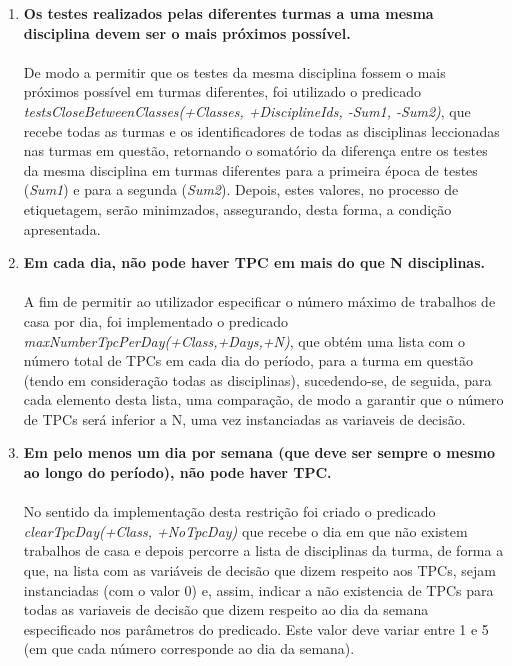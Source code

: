 \documentclass{llncs}
\begin{document}
\begin{enumerate}
	\item \textbf{Os testes realizados pelas diferentes turmas a uma mesma disciplina devem ser o mais próximos possível.} \\\\
		De modo a permitir que os testes da mesma disciplina fossem o mais próximos possível em turmas diferentes, foi utilizado o predicado  \textit{testsCloseBetweenClasses(+Classes, +DisciplineIds, -Sum1, -Sum2)}, 
		que recebe todas as turmas e os identificadores de todas as disciplinas leccionadas nas turmas em questão, retornando o somatório da diferença entre os testes da mesma disciplina em turmas diferentes para a 
		primeira época de testes (\textit{Sum1}) e para a segunda 
		(\textit{Sum2}). Depois, estes valores, no processo de etiquetagem, serão minimzados, assegurando, desta forma, a condição apresentada.
		\\

	\item \textbf{Em cada dia, não pode haver TPC em mais do que N disciplinas.} \\\\
		A fim de permitir ao utilizador especificar o número máximo de trabalhos de casa por dia, foi implementado o predicado \textit{maxNumberTpcPerDay(+Class,+Days,+N)}, que obtém uma lista com o número total de TPCs em cada dia do período, para a turma em questão (tendo em consideração todas as disciplinas), sucedendo-se, de seguida, para cada elemento desta lista, uma comparação, 
		de modo a garantir que o número de TPCs será inferior a N, uma vez instanciadas as variaveis de decisão.
		\\

	\item \textbf{Em pelo menos um dia por semana (que deve ser sempre o mesmo ao longo do período), não pode haver TPC.} \\\\
		No sentido da implementação desta restrição foi criado o predicado \textit{clearTpcDay(+Class, +NoTpcDay)} que recebe o dia em que não existem trabalhos de casa e depois percorre a lista de disciplinas da turma, de forma a que, na lista com as variáveis de decisão que dizem respeito aos TPCs, sejam instanciadas (com o valor 0) e, assim, indicar a não existencia de TPCs para todas as variaveis de decisão que dizem respeito ao dia da 
semana especificado nos parâmetros do predicado. Este valor deve variar entre 1 e 5 (em que cada número corresponde ao dia da semana).
		\\


\end{enumerate}
\end{document}
